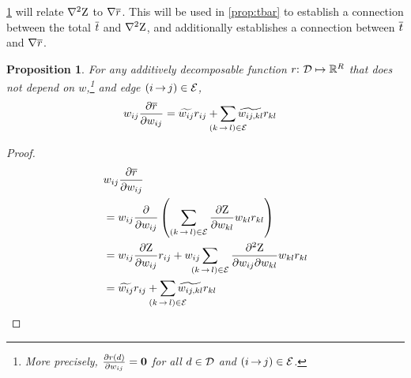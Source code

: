 \documentclass[11pt,a4paper]{article}
\newtheorem{prop}{Proposition}
\theoremstyle{definition}
\begin{document}
\cref{prop:drbar} will relate $\nabla^2{\mathrm{Z}}$ to $\nabla{\overline{r}}$.
This will be used in \cref{prop:tbar} to establish a connection between the total ${\overline{t}}$ and $\nabla^2{\mathrm{Z}}$, and additionally establishes a connection between ${\overline{t}}$ and $\nabla{\overline{r}}$.

\begin{prop}
\label{prop:drbar}
For any additively decomposable function $r{:}\,\,{\mathcal{D}} \mapsto \mathbb{R}^{{R}}$
that does not depend on $w$,\footnote{More precisely, $\frac{\partial {r({d})}}{\partial {w_{ij}}} = \boldsymbol 0$ for all ${d}\in{\mathcal{D}}$ and ${(i\,{\rightarrow}\,j)}\in{\mathcal{E}}$.} and edge ${(i\,{\rightarrow}\,j)}\in{\mathcal{E}}$,
\begin{align}\label{eq:drbar}
    \wedge{ij}&\frac{\partial\rbar}{\partial \wedge{ij}} = \totalw{ij}\redge{ij} + \smashoperator{\sum_{\edgekl\in\edges}}\totalw{ij,kl}\redge{kl}
\end{align}
\end{prop}
\begin{proof}
\begin{align*}
    &\wedge{ij}\frac{\partial\rbar}{\partial \wedge{ij}} \\
    &= \wedge{ij}\frac{\partial}{\partial\wedge{ij}}\left(\sum_{\edgekl\in\edges}\frac{\partial\wbar}{\partial\wedge{kl}}\wedge{kl}\redge{kl}\right) \\
    &= \wedge{ij}\frac{\partial\wbar}{\partial\wedge{ij}}\redge{ij} + \wedge{ij}\smashoperator{\sum_{\edgekl\in\edges}}\ \ \ \frac{\partial^2\wbar}{\partial\wedge{ij}\partial\wedge{kl}}\wedge{kl}\redge{kl} \\ 
    &= \totalw{ij}\redge{ij} + \smashoperator{\sum_{\edgekl\in\edges}}\totalw{ij,kl}\redge{kl}
\end{align*}
\end{proof}
\end{document}
